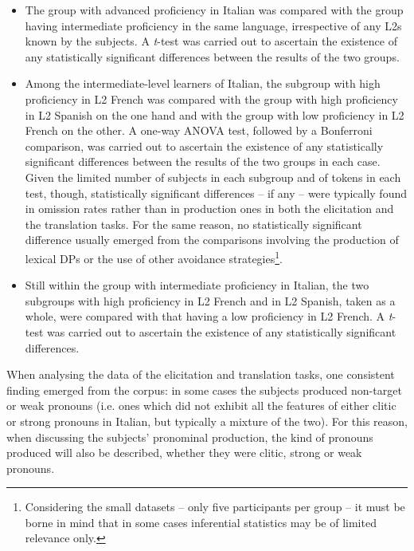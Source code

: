 \documentclass[output=paper,modfonts,nonflat,newtxmath]{langsci/langscibook}
\begin{document}
\begin{itemize}
\item
The group with advanced proficiency in Italian was compared with the group having intermediate proficiency in the same language, irrespective of any L2s known by the subjects. A \textit{t}{}-test was carried out to ascertain the existence of any statistically significant differences between the results of the two groups.

\item
Among the intermediate-level learners of Italian, the subgroup with high proficiency in L2 French was compared with the group with high proficiency in L2 Spanish on the one hand and with the group with low proficiency in L2 French on the other. A one-way ANOVA test, followed by a Bonferroni comparison, was carried out to ascertain the existence of any statistically significant differences between the results of the two groups in each case. Given the limited number of subjects in each subgroup and of tokens in each test, though, statistically significant differences – if any – were typically found in omission rates rather than in production ones in both the elicitation and the translation tasks. For the same reason, no statistically significant difference usually emerged from the comparisons involving the production of lexical DPs or the use of other avoidance strategies\footnote{ \textrm{Considering the small datasets – only five participants per group – it must be borne in mind that in some cases inferential statistics may be of limited relevance only.}}.

\item
Still within the group with intermediate proficiency in Italian, the two subgroups with high proficiency in L2 French and in L2 Spanish, taken as a whole, were compared with that having a low proficiency in L2 French. A \textit{t}{}-test was carried out to ascertain the existence of any statistically significant differences.

\end{itemize}

When analysing the data of the elicitation and translation tasks, one consistent finding emerged from the corpus: in some cases the subjects produced non-target or weak pronouns (i.e. ones which did not exhibit all the features of either clitic or strong pronouns in Italian, but typically a mixture of the two). For this reason, when discussing the subjects’ pronominal production, the kind of pronouns produced will also be described, whether they were clitic, strong or weak pronouns.
\end{document}
